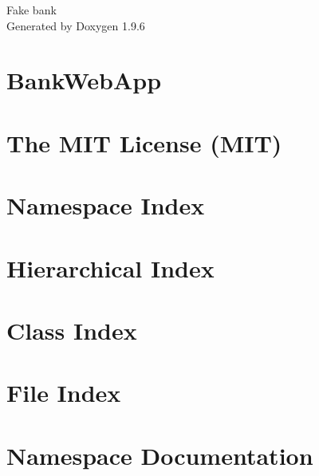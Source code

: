 \documentclass[twoside]{book}
\newcommand{\+}{\discretionary{\mbox{\scriptsize$\hookleftarrow$}}{}{}}
\newcommand{\clearemptydoublepage}{%
    \newpage{\pagestyle{empty}\cleardoublepage}%
  }
\begin{document}
  \raggedbottom
  \begin{titlepage}
  \vspace*{7cm}
  \begin{center}%
  {\Large Fake bank}\\
  \vspace*{1cm}
  {\large Generated by Doxygen 1.9.6}\\
  \end{center}
  \end{titlepage}
  \clearemptydoublepage
  \tableofcontents
  \clearemptydoublepage
\chapter{Bank\+Web\+App}
\label{index}
\chapter{The MIT License (MIT)}
\label{md__c___users_tomas_source_repos__bank_web_app_wwwroot_lib_jquery_validation__l_i_c_e_n_s_e}

\chapter{Namespace Index}

\chapter{Hierarchical Index}

\chapter{Class Index}

\chapter{File Index}

\chapter{Namespace Documentation}







\end{document}
